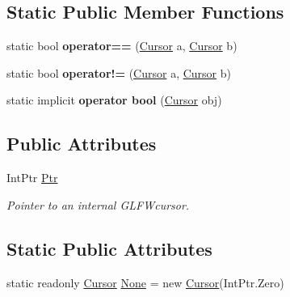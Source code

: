 \subsection*{Static Public Member Functions}
\begin{DoxyCompactItemize}
\item 
\mbox{\label{struct_glfw3_1_1_glfw_1_1_cursor_a7aa3f20144ab9e8e96fee1def6b6a173}} 
static bool {\bfseries operator==} (\mbox{\hyperlink{struct_glfw3_1_1_glfw_1_1_cursor}{Cursor}} a, \mbox{\hyperlink{struct_glfw3_1_1_glfw_1_1_cursor}{Cursor}} b)
\item 
\mbox{\label{struct_glfw3_1_1_glfw_1_1_cursor_a5ab2899fb9ac66508fbd5283fe056cef}} 
static bool {\bfseries operator!=} (\mbox{\hyperlink{struct_glfw3_1_1_glfw_1_1_cursor}{Cursor}} a, \mbox{\hyperlink{struct_glfw3_1_1_glfw_1_1_cursor}{Cursor}} b)
\item 
\mbox{\label{struct_glfw3_1_1_glfw_1_1_cursor_a0213d606ed4fadf0cba4255c90541fac}} 
static implicit {\bfseries operator bool} (\mbox{\hyperlink{struct_glfw3_1_1_glfw_1_1_cursor}{Cursor}} obj)
\end{DoxyCompactItemize}
\subsection*{Public Attributes}
\begin{DoxyCompactItemize}
\item 
Int\+Ptr \mbox{\hyperlink{struct_glfw3_1_1_glfw_1_1_cursor_a7ac68cfb8aaf790598460dac88d81e11}{Ptr}}
\begin{DoxyCompactList}\small\item\em Pointer to an internal G\+L\+F\+Wcursor. \end{DoxyCompactList}\end{DoxyCompactItemize}
\subsection*{Static Public Attributes}
\begin{DoxyCompactItemize}
\item 
static readonly \mbox{\hyperlink{struct_glfw3_1_1_glfw_1_1_cursor}{Cursor}} \mbox{\hyperlink{struct_glfw3_1_1_glfw_1_1_cursor_aa0c08d9f0ac0311fa2a09302ec493fb7}{None}} = new \mbox{\hyperlink{struct_glfw3_1_1_glfw_1_1_cursor}{Cursor}}(Int\+Ptr.\+Zero)
\end{DoxyCompactItemize}


